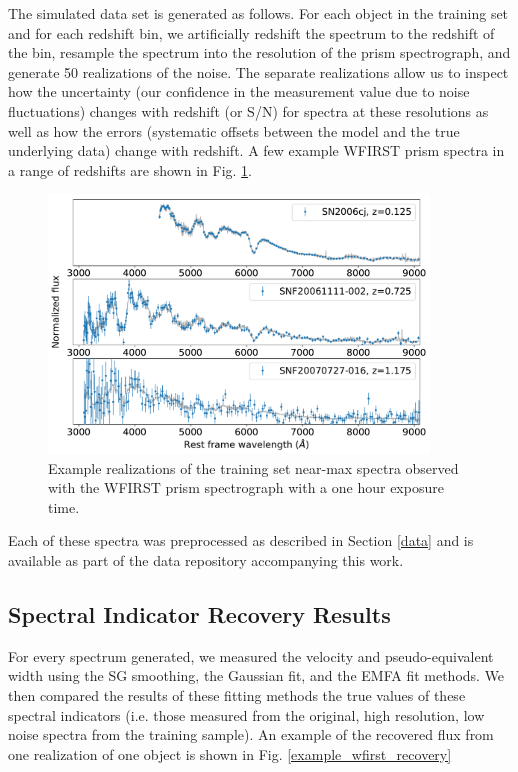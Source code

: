 The simulated data set is generated as follows. For each object in the training set and for each redshift bin, we artificially redshift the spectrum to the redshift of the bin, resample the spectrum into the resolution of the prism spectrograph, and generate 50 realizations of the noise. The separate realizations allow us to inspect how the uncertainty (our confidence in the measurement value due to noise fluctuations) changes with redshift (or S/N) for spectra at these resolutions as well as how the errors (systematic offsets between the model and the true underlying data) change with redshift. A few example WFIRST prism spectra in a range of redshifts are shown in Fig. \ref{wfirst_example_spectra}.

\begin{figure}[!htb]
    \centering
    \includegraphics[width=0.9\textwidth]{figures/si_feat_pca/wfirst_example_spectra.pdf}
    \caption{Example realizations of the training set near-max spectra observed with the WFIRST prism spectrograph with a one hour exposure time.}
    \label{wfirst_example_spectra}
\end{figure}

Each of these spectra was preprocessed as described in Section \ref{data} and is available as part of the data repository accompanying this work.

\subsection{Spectral Indicator Recovery Results}
For every spectrum generated, we measured the velocity and pseudo-equivalent width using the SG smoothing, the Gaussian fit, and the EMFA fit methods. We then compared the results of these fitting methods the true values of these spectral indicators (i.e. those measured from the original, high resolution, low noise spectra from the training sample). An example of the recovered flux from one realization of one object is shown in Fig. \ref{example_wfirst_recovery}

